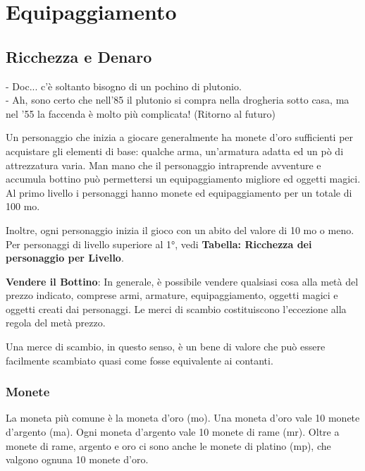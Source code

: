 \documentclass[a4paper,11pt,twoside,openany]{book}
\begin{document}
\section{Equipaggiamento}

\label{equipaggiamento}

\subsection{Ricchezza e Denaro}


\begin{tcolorbox}[enhanced,arc=5pt,boxrule=0.3pt]{
- Doc... c'è soltanto bisogno di un pochino di plutonio.\\
- Ah, sono certo che nell'85 il plutonio si compra nella drogheria sotto casa, ma nel '55 la faccenda è molto più complicata! (Ritorno al futuro)}\end{tcolorbox}\medskip


\label{ricchezza-e-denaro}

Un personaggio che inizia a giocare generalmente ha monete d'oro sufficienti per acquistare gli elementi di base: qualche arma, un'armatura adatta ed un pò di attrezzatura varia. Man mano che il personaggio intraprende avventure e accumula bottino può permettersi un equipaggiamento migliore ed oggetti magici. Al primo livello i personaggi hanno monete ed equipaggiamento per un totale di 100 mo.

Inoltre, ogni personaggio inizia il gioco con un abito del valore di 10 mo o meno. Per personaggi di livello superiore al 1°, vedi \textbf{Tabella: Ricchezza dei personaggio per Livello}.

\medskip

\textbf{Vendere il Bottino}: In generale, è possibile vendere qualsiasi cosa alla metà del prezzo indicato, comprese armi, armature, equipaggiamento, oggetti magici e oggetti creati dai personaggi. Le merci di scambio costituiscono l'eccezione alla regola del metà prezzo.

Una merce di scambio, in questo senso, è un bene di valore che può essere facilmente scambiato quasi come fosse equivalente ai contanti.

\subsubsection{Monete}

La moneta più comune è la moneta d'oro (mo). Una moneta d'oro vale 10 monete d'argento (ma). Ogni moneta d'argento vale 10 monete di rame (mr). Oltre a monete di rame, argento e oro ci sono anche le monete di platino (mp), che valgono ognuna 10 monete d'oro.
\end{document}

